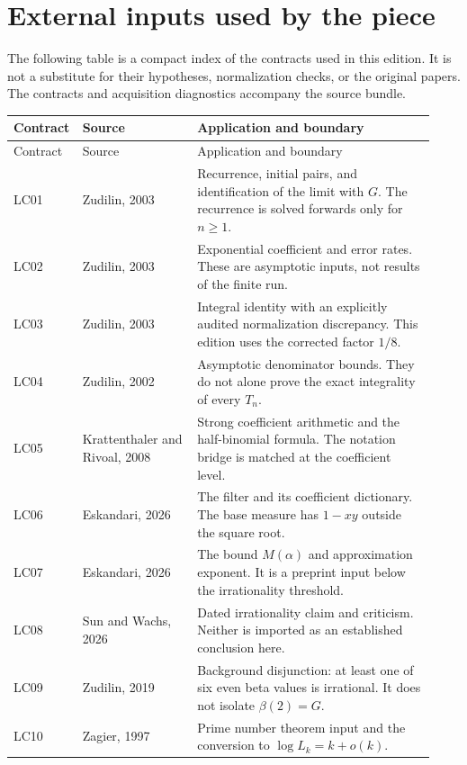 \section{External inputs used by the piece}

The following table is a compact index of the contracts used in this edition. It is not a substitute for their hypotheses, normalization checks, or the original papers. The contracts and acquisition diagnostics accompany the source bundle.

\begin{longtable}{@{}p{0.10\linewidth}p{0.27\linewidth}p{0.56\linewidth}@{}}
\toprule
Contract & Source & Application and boundary\\
\midrule
\endfirsthead
\toprule
Contract & Source & Application and boundary\\
\midrule
\endhead
\bottomrule
\endfoot
LC01 & Zudilin, 2003 & Recurrence, initial pairs, and identification of the limit with $G$. The recurrence is solved forwards only for $n\geq1$.\\[5pt]
LC02 & Zudilin, 2003 & Exponential coefficient and error rates. These are asymptotic inputs, not results of the finite run.\\[5pt]
LC03 & Zudilin, 2003 & Integral identity with an explicitly audited normalization discrepancy. This edition uses the corrected factor $1/8$.\\[5pt]
LC04 & Zudilin, 2002 & Asymptotic denominator bounds. They do not alone prove the exact integrality of every $T_n$.\\[5pt]
LC05 & Krattenthaler and Rivoal, 2008 & Strong coefficient arithmetic and the half-binomial formula. The notation bridge is matched at the coefficient level.\\[5pt]
LC06 & Eskandari, 2026 & The filter and its coefficient dictionary. The base measure has $1-xy$ outside the square root.\\[5pt]
LC07 & Eskandari, 2026 & The bound $M(\alpha)$ and approximation exponent. It is a preprint input below the irrationality threshold.\\[5pt]
LC08 & Sun and Wachs, 2026 & Dated irrationality claim and criticism. Neither is imported as an established conclusion here.\\[5pt]
LC09 & Zudilin, 2019 & Background disjunction: at least one of six even beta values is irrational. It does not isolate $\beta(2)=G$.\\[5pt]
LC10 & Zagier, 1997 & Prime number theorem input and the conversion to $\log L_k=k+o(k)$.\\
\end{longtable}

